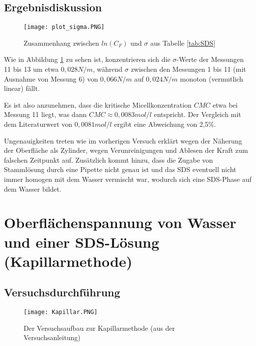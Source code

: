 \documentclass{scrartcl}
\begin{document}
\subsection{Ergebnisdiskussion}

\begin{figure}[H]
  \centering
    \texttt{[image: plot\_sigma.PNG]}
  \caption{Zusammenhang zwischen $ln(C_{F})$ und $\sigma$ aus Tabelle \ref{tab:SDS}}
  \label{fig:plot_sigma}
\end{figure}

Wie in Abbildung \ref{fig:plot_sigma} zu sehen ist, konzentrieren sich die $\sigma$-Werte der Messungen 11 bis 13 um etwa $0,028N/m$, während $\sigma$ zwischen den Messungen 1 bis 11 (mit Ausnahme von Messung 6) von $0,066N/m$ auf $0,024N/m$ monoton (vermutlich linear) fällt.

Es ist also anzunehmen, dass die kritische Micellkonzentration $CMC$ etwa bei Messung 11 liegt, was dann $CMC \approx 0,0083 mol/l$ entspricht. Der Vergleich mit dem Literaturwert von $0,0081 mol/l$ ergibt eine Abweichung von 2,5\%.

Ungenauigkeiten treten wie im vorherigen Versuch erklärt wegen der Näherung der Oberfläche als Zylinder, wegen Verunreinigungen und Ablesen der Kraft zum falschen Zeitpunkt auf.
Zusätzlich kommt hinzu, dass die Zugabe von Stammlösung durch eine Pipette nicht genau ist und das SDS eventuell nicht immer homogen mit dem Wasser vermischt war, wodurch sich eine SDS-Phase auf dem Wasser bildet.
\newpage 
\section{Oberflächenspannung von Wasser und einer SDS-Lösung (Kapillarmethode)}
\subsection{Versuchsdurchführung}
\begin{figure}[H]
  \centering
    \texttt{[image: Kapillar.PNG]}
  \caption{Der Versuchsaufbau zur Kapillarmethode (aus der Versuchsanleitung)}
  \label{fig:Kapillar}
\end{figure}
\end{document}
